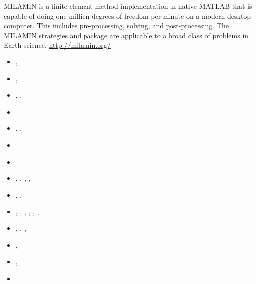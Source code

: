 MILAMIN is a finite element method implementation in native MATLAB that is capable 
of doing one million degrees of freedom per minute on a modern desktop computer. 
This includes pre-processing, solving, and post-processing. The MILAMIN strategies and 
package are applicable to a broad class of problems in Earth science. \url{http://milamin.org/}

\begin{small}
\begin{itemize}
\item[\twothousandeight]       \textcite{daks08},  \textcite{scdk08}
\item[\twothousandnine]        \textcite{gogk09},  \textcite{kalb09}
\item[\twothousandten]         \textcite{krda10},  \textcite{kaus10},  \textcite{dekc10}
\item[\twothousandeleven]      \textcite{yakm11}
\item[\twothousandtwelve]      \textcite{gebk12},  \textcite{rukb12},  \textcite{thka12}
\item[\twothousandthirteen]    \textcite{scpo13}
\item[\twothousandfourteen]    \textcite{jobk14}
\item[\twothousandfifteen]     \textcite{lukz15},  \textcite{gehm15},  \textcite{baka15}, 
                               \textcite{thkp15},  \textcite{musd15}
\item[\twothousandsixteen]     \textcite{jads16},  \textcite{maka16},  \textcite{cakp16}
\item[\twothousandeighteen]    \textcite{dusd18},  \textcite{jasc18},  \textcite{jadg18},
                               \textcite{comj18},  \textcite{jens18},  \textcite{rabw18},
                               \textcite{chsm18}
\item[\twothousandnineteen]    \textcite{sifg19},  \textcite{baba19},  \textcite{sogh19},  
                               \textcite{anpa19}
\item[\twothousandtwenty]      \textcite{hube20},  \textcite{peaa20}
\item[\twothousandtwentythree] \textcite{lilm23},  \textcite{rapa23} 
\item[\twothousandtwentyfour]  \textcite{pexc24} 
\end{itemize}
\end{small}



